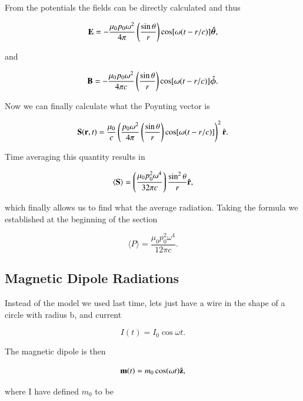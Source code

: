 \documentclass[preprint, review,12pt]{elsarticle}
\def\b{\textbf}
\def\9{\left(}
\def\0{\right)}
\newcommand{\hb}[1]{\hat{\b #1}}
\newcommand{\hbm}[1]{\hat{\bm #1}}
\newcommand{\brak}[1]{\langle #1 \rangle}
\begin{document}
From the potentials the fields can be directly calculated and thus

\begin{equation}
    \b E = - \frac{\mu_0 p_0 \omega^2}{4 \pi} \9 \frac{\sin\theta}{r} \0 \cos[\omega(t-r/c)] \hbm{\theta},
\end{equation}

and

\begin{equation}
    \b B = - \frac{\mu_0 p_0 \omega^2}{4 \pi c} \9 \frac{\sin\theta}{r} \0 \cos[\omega(t-r/c)] \hbm{\phi}.
\end{equation}

Now we can finally calculate what the Poynting vector is

\begin{equation}
    \b S(\b r, t) = \frac{\mu_0}{c} \9 \frac{p_0 \omega^2}{4 \pi} \9 \frac{\sin\theta}{r} \0 \cos[\omega(t-r/c)] \0^2 \hb{r}.
\end{equation}

Time averaging this quantity results in

\begin{equation}
    \brak{\b S} = \9 \frac{\mu_0 p_0^2 \omega^4}{32\pi c} \0 \frac{\sin^2 \theta}{r}\hb{r},
\end{equation}

which finally allows us to find what the average radiation. Taking the formula we established at the beginning of the section

\begin{equation}
    \brak{P} = \frac{\mu_0 p_0^2 \omega^4}{12 \pi c}.
\end{equation}

\subsection{Magnetic Dipole Radiations}

Instead of the model we used last time, lets just have a wire in the shape of a circle with radius b, and current 

\begin{equation}
    I(t) = I_0 \cos\omega t.
\end{equation}

The magnetic dipole is then 

\begin{equation}
    \b m(t) = m_0 \cos(\omega t) \hb{z},
\end{equation}

where I have defined $m_0$ to be
\end{document}
